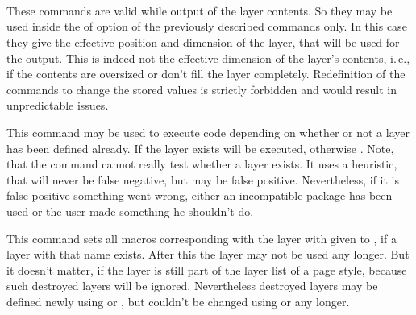 \begin{Declaration}
  \\
  \\
  \\
\end{Declaration}
%
%
%
%
These commands are valid while output of the layer contents. So they may be used
inside the  of option  of the previously
described commands only. In this case they give the effective position and
dimension of the layer, that will be used for the output. This is indeed not
the effective dimension of the layer's contents, i.\,e., if the contents are
oversized or don't fill the layer completely. Redefinition of the commands to
change the stored values is strictly forbidden and would result in
unpredictable issues.%
%
%
%
%

\begin{Declaration}
\end{Declaration}
%
This command may be used to execute code depending on whether or not a layer
has been defined already. If the layer exists  will be
executed, otherwise . Note, that the command cannot really
test whether a layer exists. It uses a heuristic, that will never be false
negative, but may be false positive. Nevertheless, if it is false positive
something went wrong, either an incompatible package has been used or the user
made something he shouldn't do.%

\begin{Declaration}
\end{Declaration}
%
This command sets all macros corresponding with the layer with given
 to , if a layer with that name exists. After
this the layer may not be used any longer. But it doesn't matter, if the layer
is still part of the layer list of a page style, because such destroyed layers
will be ignored. Nevertheless destroyed layers may be defined newly using
 or , but couldn't be changed using
 or  any longer. 

